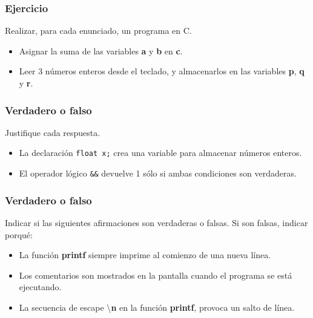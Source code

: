 \begin{ejercicioClase}
    \subsubsection{Ejercicio}
    Realizar, para cada enunciado, un programa en C.
    \begin{itemize}
        \item Asignar la suma de las variables \textbf{a} y \textbf{b} en \textbf{c}.
      \item Leer 3 números enteros desde el teclado, y almacenarlos en las variables \textbf{p}, \textbf{q} y \textbf{r}.
    \end{itemize}

    \subsubsection{Verdadero o falso}
    Justifique cada respuesta.
    \begin{itemize}
      \item La declaración \texttt{float x;} crea una variable para almacenar números enteros.
      \item El operador lógico \texttt{\&\&} devuelve 1 sólo si ambas condiciones son verdaderas.
    \end{itemize}

    \subsubsection{Verdadero o falso}
    Indicar si las siguientes afirmaciones son verdaderas o falsas. Si son falsas, indicar porqué:
    \begin{itemize}
      \item La función \textbf{printf} siempre imprime al comienzo de una nueva línea.
      \item Los comentarios son mostrados en la pantalla cuando el programa se está ejecutando.
      \item La secuencia de escape \textbackslash \textbf{n} en la función \textbf{printf}, provoca un salto de línea.
    \end{itemize}

\end{ejercicioClase}



